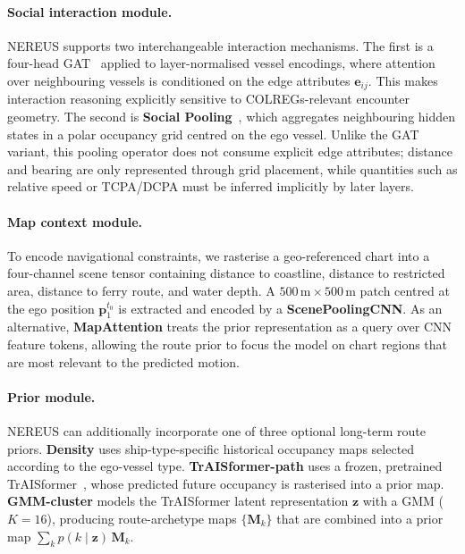 \documentclass[runningheads]{preamp/llncs}
\begin{document}
\paragraph{Social interaction module.}
\ac{NEREUS} supports two interchangeable interaction mechanisms.
The first is a four-head \ac{GAT}~\cite{velivckovic2018graph} applied to layer-normalised vessel encodings,
where
attention over neighbouring vessels is conditioned on the edge attributes $\mathbf{e}_{ij}$.
This makes interaction reasoning explicitly sensitive to \ac{COLREGs}-relevant encounter geometry.
%
The second is \textbf{Social Pooling}~\cite{lee2017desire},
which aggregates neighbouring hidden states in a polar occupancy grid centred on the ego vessel.
Unlike the \ac{GAT} variant,
this pooling operator does not consume explicit edge attributes;
distance and bearing are only represented through grid placement,
while quantities such as relative speed or \ac{TCPA}/\ac{DCPA} must be inferred
implicitly by later layers.

\paragraph{Map context module.}
To encode navigational constraints,
we rasterise a geo-referenced chart into a four-channel scene tensor containing
distance to coastline, distance to restricted area, distance to ferry route, and water depth.
%
A $500\,\text{m}\times500\,\text{m}$ patch centred at the ego position
$\mathbf{p}_1^{t_0}$ is extracted and encoded by a \textbf{ScenePoolingCNN}.
%
As an alternative,
\textbf{MapAttention} treats the prior representation as a query over CNN feature tokens,
allowing the route prior to focus the model on chart regions that are most relevant
to the predicted motion.

\paragraph{Prior module.}
\ac{NEREUS} can additionally incorporate one of three optional long-term route priors.
\textbf{Density}
uses ship-type-specific historical occupancy maps selected according to the ego-vessel type.
\textbf{TrAISformer-path}
uses a frozen, pretrained TrAISformer~\cite{nguyen2024transformer},
whose predicted future occupancy is rasterised into a prior map.
\textbf{GMM-cluster} models the TrAISformer latent representation $\mathbf{z}$ with a \ac{GMM} ($K{=}16$),
producing route-archetype maps $\{\mathbf{M}_k\}$ that are combined into a prior map
$\sum_k p(k\mid\mathbf{z})\,\mathbf{M}_k$.
\end{document}
